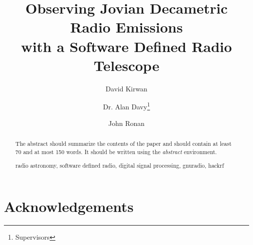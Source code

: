 \documentclass[runningheads,a4paper]{llncs}
\newcommand{\keywords}[1]{\par\addvspace\baselineskip
\noindent\keywordname\enspace\ignorespaces#1}
\begin{document}
\mainmatter  %

\title{Observing Jovian Decametric Radio Emissions\\
with a Software Defined Radio Telescope}


%
%
\author{David Kirwan%
\and Dr. Alan Davy\thanks{Supervisors} \and John Ronan\footnotemark[1]}
%


%
%
\maketitle
%
\begin{abstract}
The abstract should summarize the contents of the paper and should
contain at least 70 and at most 150 words. It should be written using the
\emph{abstract} environment.
\keywords{radio astronomy, software defined radio, digital signal processing, gnuradio, hackrf}
\end{abstract}
%

\newpage
\chapter*{Acknowledgements}
\end{document}
